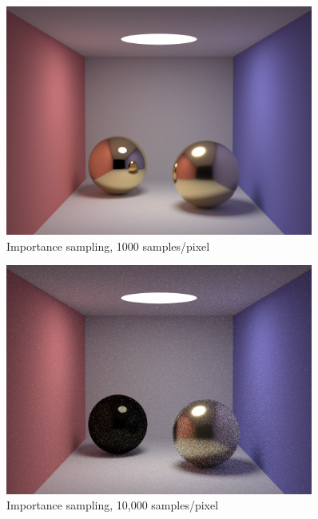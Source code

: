 \documentclass[10pt]{beamer}
\begin{document}
\begin{frame}
	\begin{figure}[H]
  \centering
    \includegraphics[width=0.9\textwidth]{convergedIS.png}
    \caption{Importance sampling, 1000 samples/pixel}
\end{figure}
\end{frame}

\begin{frame}
	\begin{figure}[H]
  \centering
    \includegraphics[width=0.9\textwidth]{10KDS.png}
    \caption{Importance sampling, 10,000 samples/pixel}
\end{figure}
\end{frame}
\end{document}
